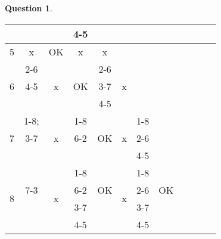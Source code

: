 \documentclass[11pt,a4paper]{article}
\theoremstyle{definition}%
\newtheorem{Q}{Question}[] %
\begin{document}
\begin{Q}
{\begin{center}
\begin{tabular}{|c|c|c|c|c|c|c|c|c|c|c|c|}
				 & \cellcolor{red!25} & & \cellcolor{red!25}4-5 & \cellcolor{gray!20} & \cellcolor{gray!20} & \cellcolor{gray!20} & \cellcolor{gray!20} \\ \hline
				5 & x & \cellcolor{green!25}OK & x & x & \cellcolor{gray!20} & \cellcolor{gray!20} & \cellcolor{gray!20} \\ \hline
				\multirow{3}{*}{6} & \cellcolor{red!25}2-6 & \multirow{3}{*}{x} & \cellcolor{green!25} & \cellcolor{red!25}2-6 & \multirow{3}{*}{x} & \cellcolor{gray!20} &\cellcolor{gray!20} \\
				 & \cellcolor{red!25}4-5 &  & \cellcolor{green!25}OK & \cellcolor{red!25}3-7 &  & \cellcolor{gray!20} &  \cellcolor{gray!20}\\
				 & \cellcolor{red!25} &  & \cellcolor{green!25} & \cellcolor{red!25}4-5 &  & \cellcolor{gray!20} &  \cellcolor{gray!20}\\ \hline
				\multirow{3}{*}{7} & \cellcolor{red!25}1-8; & \multirow{3}{*}{x} & \cellcolor{red!25}1-8 & \cellcolor{green!25} & \multirow{3}{*}{x} & \cellcolor{red!25}1-8 & \cellcolor{gray!20} \\
				 & \cellcolor{red!25}3-7 &  & \cellcolor{red!25}6-2 & \cellcolor{green!25}OK &  & \cellcolor{red!25}2-6 & \cellcolor{gray!20} \\
				 & \cellcolor{red!25} & & \cellcolor{red!25} & \cellcolor{green!25} &  & \cellcolor{red!25}4-5 & \cellcolor{gray!20} \\ \hline
				\multirow{4}{*}{8} & \cellcolor{red!25} & \multirow{4}{*}{x} & \cellcolor{red!25}1-8  & \cellcolor{green!25}  & \multirow{4}{*}{x}  & \cellcolor{red!25}1-8 & \cellcolor{green!25} \\
				& \cellcolor{red!25}7-3 &  & \cellcolor{red!25}6-2 & \cellcolor{green!25}OK & & \cellcolor{red!25}2-6 & \cellcolor{green!25} OK \\
				& \cellcolor{red!25} &  & \cellcolor{red!25}3-7 & \cellcolor{green!25} & & \cellcolor{red!25}3-7 & \cellcolor{green!25} \\
				& \cellcolor{red!25} &  & \cellcolor{red!25}4-5 & \cellcolor{green!25} & & \cellcolor{red!25}4-5 & \cellcolor{green!25} \\ \hline

\end{tabular}
\end{center}}
\end{Q}
\end{document}

